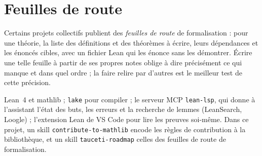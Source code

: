 \section{Feuilles de route}

Certains projets collectifs publient des \emph{feuilles de route} de formalisation : pour
une théorie, la liste des définitions et des théorèmes à écrire, leurs dépendances et les
énoncés cibles, avec un fichier Lean qui les énonce sans les démontrer. Écrire une telle
feuille à partir de ses propres notes oblige à dire précisément ce qui manque et dans quel
ordre ; la faire relire par d'autres est le meilleur test de cette précision.

\begin{outils}
Lean~4 et mathlib ; \texttt{lake} pour compiler ; le serveur MCP \texttt{lean-lsp}, qui
donne à l'assistant l'état des buts, les erreurs et la recherche de lemmes (LeanSearch,
Loogle) ; l'extension Lean de VS Code pour lire les preuves soi-même. Dans ce projet, un skill
\texttt{contribute-to-mathlib} encode les règles de contribution à la bibliothèque, et un
skill \texttt{tauceti-roadmap} celles des feuilles de route de formalisation.
\end{outils}
